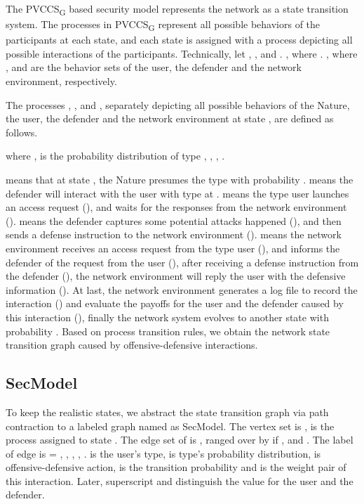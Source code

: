 \documentclass[10pt, conference, compsocconf]{IEEEtran}
\begin{document}
The PVCCS\textsubscript{G} based security model represents the network as a state transition system.
The processes in PVCCS\textsubscript{G} represent all possible behaviors of the participants at each state, and each state is assigned with a process depicting all possible interactions of the participants. Technically, let , ,   and .
, where .
, where ,  and  are the behavior sets of the user, the defender and the network environment, respectively.


The processes ,  ,  and , separately depicting all possible behaviors of the Nature, the user, the defender and the network environment at state , are defined as follows.

\begin{footnotesize}

\end{footnotesize}
where ,  is the probability distribution of type , ,
, .

 means that at state , the Nature presumes the type  with probability .
 means the defender will interact with the user with type  at .
 means the type  user launches an access request  (), and waits for the responses from the network environment ().
 means the defender captures some  potential attacks happened (), and then sends a defense instruction  to the network environment ().
 means the network environment receives an access request from the type  user (), and informs the defender of the request from the user (), after receiving a defense instruction from the defender (), the network environment will reply the user with the defensive information ().
At last, the network environment generates a log file to record the interaction () and evaluate the payoffs for the user and the defender caused by this interaction (), finally the network system evolves to another state with probability .
Based on process transition rules, we obtain the network state transition graph caused by offensive-defensive interactions.
\subsection{SecModel}
To keep the realistic states,
we abstract the state transition graph via path contraction \cite{reinhard} to a labeled graph named as SecModel.
The vertex set is ,  is the process assigned to state .
The edge set of  is , ranged over by  if , and .
The label of edge  is = , , ,  , .  is the user's type,  is type's probability distribution,  is offensive-defensive action,  is the transition probability and  is the weight pair of this interaction. Later, superscript  and  distinguish the value for the user and the defender.
\end{document}
